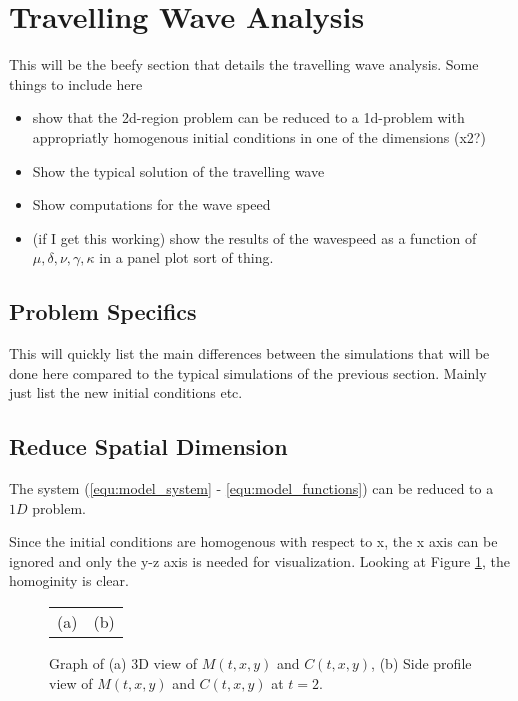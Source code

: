 \section{Travelling Wave Analysis}

This will be the beefy section that details the travelling wave analysis.
Some things to include here
\begin{itemize}
  \item show that the 2d-region problem can be reduced to a 1d-problem with appropriatly homogenous initial conditions in one of the dimensions (x2?)
   \item Show the typical solution of the travelling wave
   \item Show computations for the wave speed
   \item (if I get this working) show the results of the wavespeed as a function of $\mu, \delta, \nu, \gamma, \kappa$ in a panel plot sort of thing.
\end{itemize}


\subsection{Problem Specifics}

This will quickly list the main differences between the simulations that will be done here compared to the typical simulations of the previous section.
Mainly just list the new initial conditions etc.

\subsection{Reduce Spatial Dimension}


  The system (\ref{equ:model_system} - \ref{equ:model_functions}) can be reduced to a $1D$ problem. 
  
  
  Since the initial conditions are homogenous with respect to x, the x axis can be ignored and only the y-z axis is needed for visualization. Looking at Figure \ref{fig:visual}, the homoginity is clear.
   
  \begin{figure}[h!bt]
    \begin{center}
      \begin{tabular}{c c}
        (a) & (b) \\
      \end{tabular}
      \caption{Graph of (a) 3D view of $M(t,x,y)$ and $C(t,x,y)$, (b) Side profile view of $M(t,x,y)$ and $C(t,x,y)$ at $t=2$.} 
      \label{fig:visual}
    \end{center}
  \end{figure}
   
